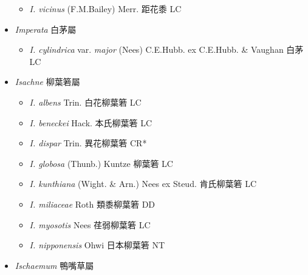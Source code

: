 \begin{itemize}
  \begin{itemize}
        \item[] \textit{I. vicinus} (F.M.Bailey) Merr.  距花黍   LC
  \end{itemize}
 \item[] \textit{Imperata} 白茅屬
                                
  \begin{itemize}
        \item[] \textit{I. cylindrica} var. \textit{major} (Nees) C.E.Hubb. ex C.E.Hubb. \& Vaughan  白茅   LC
  \end{itemize}
 \item[] \textit{Isachne} 柳葉箬屬
                                
  \begin{itemize}
        \item[] \textit{I. albens} Trin.  白花柳葉箬   LC
        \item[] \textit{I. beneckei} Hack.  本氏柳葉箬   LC
        \item[] \textit{I. dispar} Trin.  異花柳葉箬   CR*
        \item[] \textit{I. globosa} (Thunb.) Kuntze  柳葉箬   LC
        \item[] \textit{I. kunthiana} (Wight. \& Arn.) Nees ex Steud.  肯氏柳葉箬   LC
        \item[] \textit{I. miliaceae} Roth  類黍柳葉箬   DD
        \item[] \textit{I. myosotis} Nees  荏弱柳葉箬   LC
        \item[] \textit{I. nipponensis} Ohwi  日本柳葉箬   NT
  \end{itemize}
 \item[] \textit{Ischaemum} 鴨嘴草屬
                                

\end{itemize}
